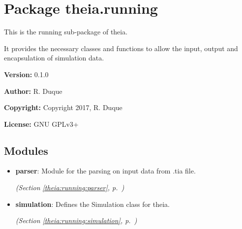 %
%
%


\section{Package theia.running}

    \label{theia:running}
This is the running sub-package of theia.

It provides the necessary classes and functions to allow the input, output 
and encapsulation of simulation data.

\textbf{Version:} 0.1.0



\textbf{Author:} R. Duque



\textbf{Copyright:} Copyright 2017, R. Duque



\textbf{License:} GNU GPLv3+





\subsection{Modules}

\begin{itemize}
\setlength{\parskip}{0ex}
\item \textbf{parser}: Module for the parsing on input data from .tia file.



  \textit{(Section \ref{theia:running:parser}, p.~\pageref{theia:running:parser})}

\item \textbf{simulation}: Defines the Simulation class for theia.



  \textit{(Section \ref{theia:running:simulation}, p.~\pageref{theia:running:simulation})}

\end{itemize}

